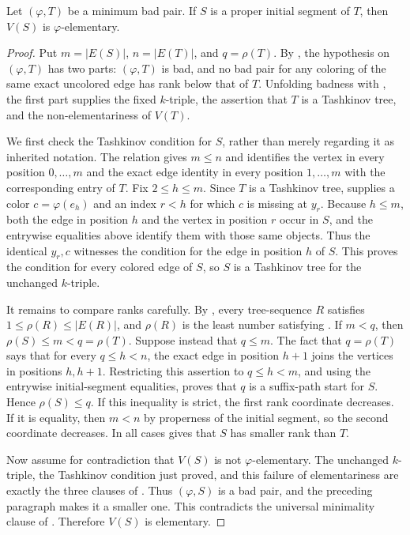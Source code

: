 \begin{lemma}
Let \((\varphi,T)\) be a minimum bad pair.  If \(S\) is a proper initial
segment of \(T\), then \(V(S)\) is \(\varphi\)-elementary.
\end{lemma}
\begin{proof}
Put \(m=|E(S)|\), \(n=|E(T)|\), and \(q=\rho(T)\).  By
, the hypothesis on \((\varphi,T)\)
has two parts: \((\varphi,T)\) is bad, and no bad pair for any coloring
of the same exact uncolored edge has rank below that of \(T\).  Unfolding
badness with , the first part supplies the fixed
\(k\)-triple, the assertion that \(T\) is a Tashkinov tree, and the
non-elementariness of \(V(T)\).

We first check the Tashkinov condition for \(S\), rather than merely
regarding it as inherited notation.  The relation
 gives \(m\le n\) and identifies the
vertex in every position \(0,\ldots,m\) and the exact edge identity in
every position \(1,\ldots,m\) with the corresponding entry of \(T\).
Fix \(2\le h\le m\).  Since \(T\) is a Tashkinov tree,
 supplies a color \(c=\varphi(e_h)\) and an index
\(r<h\) for which \(c\) is missing at \(y_r\).  Because \(h\le m\), both
the edge in position \(h\) and the vertex in position \(r\) occur in
\(S\), and the entrywise equalities above identify them with those same
objects.  Thus the identical \(y_r,c\) witnesses the condition for the
edge in position \(h\) of \(S\).  This proves the condition for every
colored edge of \(S\), so \(S\) is a Tashkinov tree for the unchanged
\(k\)-triple.

It remains to compare ranks carefully.  By
, every tree-sequence \(R\) satisfies
\(1\le\rho(R)\le |E(R)|\), and \(\rho(R)\) is the least number satisfying
.  If \(m<q\), then
\(\rho(S)\le m<q=\rho(T)\).  Suppose instead that \(q\le m\).  The fact
that \(q=\rho(T)\) says that for every \(q\le h<n\), the exact edge in
position \(h+1\) joins the vertices in positions \(h,h+1\).  Restricting
this assertion to \(q\le h<m\), and using the entrywise initial-segment
equalities, proves that \(q\) is a suffix-path start for \(S\).  Hence
\(\rho(S)\le q\).  If this inequality is strict, the first rank coordinate
decreases.  If it is equality, then \(m<n\) by properness of the initial
segment, so the second coordinate decreases.  In all cases
 gives that \(S\) has smaller rank than \(T\).

Now assume for contradiction that \(V(S)\) is not
\(\varphi\)-elementary.  The unchanged \(k\)-triple, the Tashkinov
condition just proved, and this failure of elementariness are exactly the
three clauses of .  Thus \((\varphi,S)\) is a bad
pair, and the preceding paragraph makes it a smaller one.  This contradicts
the universal minimality clause of .
Therefore \(V(S)\) is elementary.
\end{proof}
